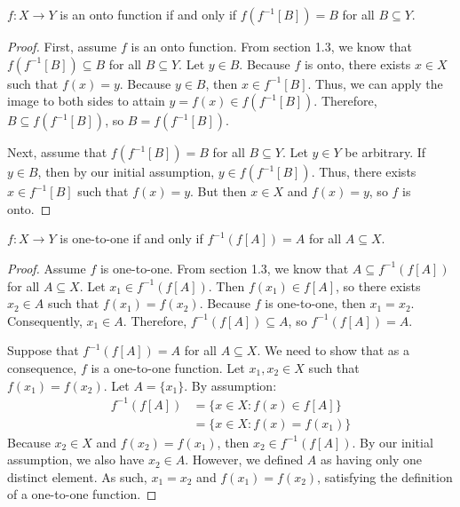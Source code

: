\documentclass[letterpaper,12pt]{report}
\begin{document}
\begin{exbox}{}{}
    $f : X \to Y$ is an onto function if and only if $f(f^{-1}[B]) = B$ for all $B \subseteq Y$.
    \tcblower
    \begin{proof}
        First, assume $f$ is an onto function. From section 1.3, we know that $f(f^{-1}[B]) \subseteq B$ for all $B \subseteq Y$. Let $y \in B$. Because $f$ is onto, there exists $x \in X$ such that $f(x) = y$. Because $y \in B$, then $x \in f^{-1}[B]$. Thus, we can apply the image to both sides to attain $y = f(x) \in f(f^{-1}[B])$. Therefore, $B \subseteq f(f^{-1}[B])$, so $B = f(f^{-1}[B])$.

        Next, assume that $f(f^{-1}[B]) = B$ for all $B \subseteq Y$. Let $y \in Y$ be arbitrary. If $y \in B$, then by our initial assumption, $y \in f(f^{-1}[B])$. Thus, there exists $x \in f^{-1}[B]$ such that $f(x) = y$. But then $x \in X$ and $f(x) = y$, so $f$ is onto.
    \end{proof}
\end{exbox}

\begin{exbox}{}{}
    $f : X \to Y$ is one-to-one if and only if $f^{-1}(f[A]) = A$ for all $A \subseteq X$.
    \tcblower
    \begin{proof}
        Assume $f$ is one-to-one. From section 1.3, we know that $A \subseteq f^{-1}(f[A])$ for all $A \subseteq X$. Let $x_1 \in f^{-1}(f[A])$. Then $f(x_1) \in f[A]$, so there exists $x_2 \in A$ such that $f(x_1) = f(x_2)$. Because $f$ is one-to-one, then $x_1 = x_2$. Consequently, $x_1 \in A$. Therefore, $f^{-1}(f[A]) \subseteq A$, so $f^{-1}(f[A]) = A$.

        Suppose that $f^{-1}(f[A]) = A$ for all $A \subseteq X$. We need to show that as a consequence, $f$ is a one-to-one function. Let $x_1, x_2 \in X$ such that $f(x_1) = f(x_2)$. Let $A = \{ x_1 \}$. By assumption:
        \begin{align*}
            f^{-1}(f[A]) &= \{ x \in X : f(x) \in f[A] \} \\
            &= \{ x \in X : f(x) = f(x_1) \}
        \end{align*}
         Because $x_2 \in X$ and $f(x_2) = f(x_1)$, then $x_2 \in f^{-1}(f[A])$. By our initial assumption, we also have $x_2 \in A$. However, we defined $A$ as having only one distinct element. As such, $x_1 = x_2$ and $f(x_1) = f(x_2)$, satisfying the definition of a one-to-one function.
    \end{proof}
\end{exbox}
\end{document}
